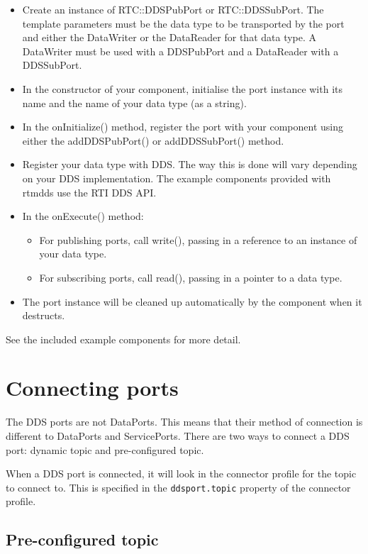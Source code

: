 \documentclass[a4paper,10pt]{article}
\newcommand{\ilcode}[1]{\lstinline|#1|}
\begin{document}
\begin{itemize}
  \item Create an instance of RTC::DDSPubPort or RTC::DDSSubPort. The
  template parameters must be the data type to be transported by the
  port and either the DataWriter or the DataReader for that data type. A
  DataWriter must be used with a DDSPubPort and a DataReader with a
  DDSSubPort.
  \item In the constructor of your component, initialise the port
  instance with its name and the name of your data type (as a string).
  \item In the onInitialize() method, register the port with your
  component using either the addDDSPubPort() or addDDSSubPort() method.
  \item Register your data type with DDS. The way this is done will vary
  depending on your DDS implementation. The example components provided
  with rtmdds use the RTI DDS API.
  \item In the onExecute() method:
  \begin{itemize}
    \item For publishing ports, call write(), passing in a reference to
    an instance of your data type.
    \item For subscribing ports, call read(), passing in a pointer to a
    data type.
  \end{itemize}
  \item The port instance will be cleaned up automatically by the
  component when it destructs.
\end{itemize}

See the included example components for more detail.

\section{Connecting ports}
\label{sec:connecting}

The DDS ports are not DataPorts. This means that their method of
connection is different to DataPorts and ServicePorts. There are two
ways to connect a DDS port: dynamic topic and pre-configured topic.

When a DDS port is connected, it will look in the connector profile for
the topic to connect to. This is specified in the \ilcode{ddsport.topic}
property of the connector profile.

\subsection{Pre-configured topic}
\end{document}
